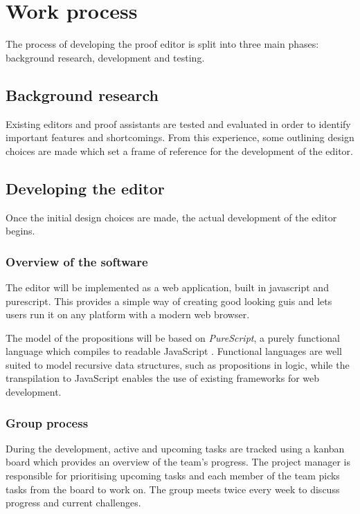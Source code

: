 \section{Work process}
The process of developing the proof editor is split into three main phases:
background research, development and testing.

\subsection{Background research}
Existing editors and proof assistants are tested and evaluated in order to identify important features and shortcomings. From this experience, some outlining design choices are made which set a frame of reference for the development of the editor.

\subsection{Developing the editor}

Once the initial design choices are made, the actual development of the editor begins.

\subsubsection{Overview of the software}
The editor will be implemented as a web application, built in \gls{javascript} and \gls{purescript}. This provides a simple way of creating good looking \glspl{gui} and lets users run it on any platform with a modern web browser.

The model of the propositions will be based on \textit{PureScript}, a purely functional language which compiles to readable JavaScript \cite{purescript}. Functional languages are well suited to model recursive data structures, such as propositions in logic, while the \gls{transpilation} to JavaScript enables the use of existing frameworks for web development.

\subsubsection{Group process}
During the development, active and upcoming tasks are tracked using a \Gls{kanban} board which provides an overview of the team's progress. The project manager is responsible for prioritising upcoming tasks and each member of the team picks tasks from the board to work on. The group meets twice every week to discuss progress and current challenges.

